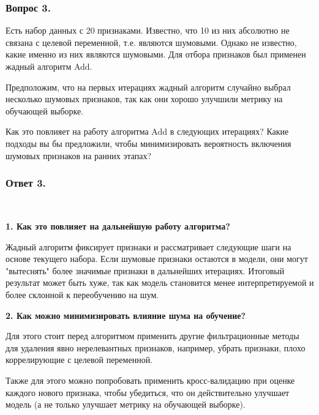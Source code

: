 \subsubsection{Вопрос 3.}

Есть набор данных с 20 признаками. Известно, что 10 из них абсолютно не связана с целевой переменной, т.е. являются шумовыми. Однако не известно, какие именно из них являются шумовыми. Для отбора признаков был применен жадный алгоритм Add.

Предположим, что на первых итерациях жадный алгоритм случайно выбрал несколько шумовых признаков, так как они хорошо улучшили метрику на обучающей выборке.

Как это повлияет на работу алгоритма Add в следующих итерациях? Какие подходы вы бы предложили, чтобы минимизировать вероятность включения шумовых признаков на ранних этапах?

\subsubsection{Ответ 3.}\

\textbf{1. Как это повлияет на дальнейшую работу алгоритма?}

Жадный алгоритм фиксирует признаки и рассматривает следующие шаги на основе текущего набора. Если шумовые признаки остаются в модели, они могут "вытеснять" более значимые признаки в дальнейших итерациях.
Итоговый результат может быть хуже, так как модель становится менее интерпретируемой и более склонной к переобучению на шум.

\textbf{2. Как можно минимизировать влияние шума на обучение?}

Для этого стоит перед алгоритмом применить другие фильтрационные методы для удаления явно нерелевантных признаков, например, убрать признаки, плохо коррелирующие с целевой переменной.

Также для этого можно попробовать применить кросс-валидацию при оценке каждого нового признака, чтобы убедиться, что он действительно улучшает модель (а не только улучшает метрику на обучающей выборке).
